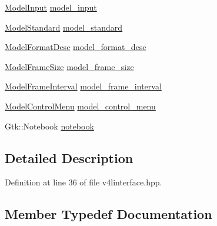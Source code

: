 \begin{DoxyCompactItemize}
\hyperlink{class_v_s_s_s___g_u_i_1_1_v4_l_interface_a1595c870c26f3848005f8211eeb67b18}{Model\+Input} \hyperlink{class_v_s_s_s___g_u_i_1_1_v4_l_interface_ae8abf07c92a05ed82cadcabe7690e3fd}{model\+\_\+input}
\item 
\hyperlink{class_v_s_s_s___g_u_i_1_1_v4_l_interface_a85b346fe61c675eb9a028a2ca9015dca}{Model\+Standard} \hyperlink{class_v_s_s_s___g_u_i_1_1_v4_l_interface_a369b8c6176f510330e83f567b4aa4887}{model\+\_\+standard}
\item 
\hyperlink{class_v_s_s_s___g_u_i_1_1_v4_l_interface_a9bb7c5c7917abee18c12e6aaa0c4a880}{Model\+Format\+Desc} \hyperlink{class_v_s_s_s___g_u_i_1_1_v4_l_interface_abd94aec4d6c691967cee26950e179fd1}{model\+\_\+format\+\_\+desc}
\item 
\hyperlink{class_v_s_s_s___g_u_i_1_1_v4_l_interface_adce6707a83ac1b5cd9dc7ee8b2929475}{Model\+Frame\+Size} \hyperlink{class_v_s_s_s___g_u_i_1_1_v4_l_interface_a04efec56b83f5abf62316fd79ee5ef22}{model\+\_\+frame\+\_\+size}
\item 
\hyperlink{class_v_s_s_s___g_u_i_1_1_v4_l_interface_a7813513200948f4605691c33e40e15a9}{Model\+Frame\+Interval} \hyperlink{class_v_s_s_s___g_u_i_1_1_v4_l_interface_ae6a12566332a48cf41aa8d4bbea6671e}{model\+\_\+frame\+\_\+interval}
\item 
\hyperlink{class_v_s_s_s___g_u_i_1_1_v4_l_interface_a4aa300e0a5f845ba2d153774035a9d97}{Model\+Control\+Menu} \hyperlink{class_v_s_s_s___g_u_i_1_1_v4_l_interface_ac98e20c4b2875e7137f867b3da753640}{model\+\_\+control\+\_\+menu}
\item 
Gtk\+::\+Notebook \hyperlink{class_v_s_s_s___g_u_i_1_1_v4_l_interface_a658017c295c18a779272aa6182664da5}{notebook}
\end{DoxyCompactItemize}


\subsection{Detailed Description}


Definition at line 36 of file v4linterface.\+hpp.



\subsection{Member Typedef Documentation}
\mbox{\label{class_v_s_s_s___g_u_i_1_1_v4_l_interface_a4aa300e0a5f845ba2d153774035a9d97}} 
